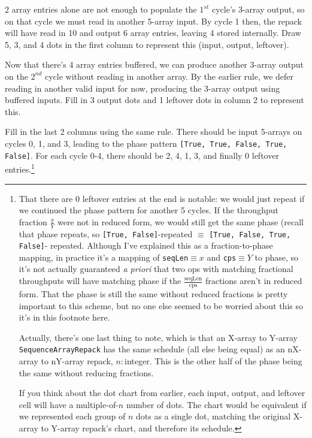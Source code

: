 \documentclass[12pt]{article}
\begin{document}
2 array entries alone are not enough to populate the $1^{st}$ cycle's
3-array output, so on that cycle we must read in another 5-array
input. By cycle 1 then, the repack will have read in 10 and output 6
array entries, leaving 4 stored internally. Draw 5, 3, and 4 dots in
the first column to represent this (input, output, leftover).

Now that there's 4 array entries buffered, we can produce another
3-array output on the $2^{nd}$ cycle without reading in another array.
By the earlier rule, we defer reading in another valid input for now,
producing the 3-array output using buffered inputs. Fill in 3 output
dots and 1 leftover dots in column 2 to represent this.

Fill in the last 2 columns using the same rule. There should be
input 5-arrays on cycles 0, 1, and 3, leading to the phase pattern
\texttt{[True, True, False, True, False]}. For each cycle 0-4, there
should be 2, 4, 1, 3, and finally 0 leftover entries.\footnote{
That there are 0 leftover entries at the end is notable: we would
just repeat if we continued the phase pattern for another 5 cycles.
If the throughput fraction $\frac{x}{Y}$ were not in reduced form, we
would still get the same phase (recall that phase repeats, so
\texttt{[True, False]}-repeated $\equiv$ \texttt{[True, False, True, False]}-%
repeated. Although I've explained this as a fraction-to-phase mapping,
in practice it's a mapping of \texttt{seqLen}$\equiv x$ and
\texttt{cps}$\equiv Y$ to phase, so it's not actually guaranteed
\textit{a priori} that two ops with matching fractional throughputs
will have matching phase if the $\frac{\text{seqLen}}{\text{cps}}$
fractions aren't in reduced form. That the phase is still the same
without reduced fractions is pretty important to this scheme, but
no one else seemed to be worried about this so it's in this footnote
here.

Actually, there's one last thing to note, which is that an
X-array to Y-array \texttt{SequenceArrayRepack} has the same schedule
(all else being equal) as an nX-array to nY-array repack, $n:$integer.
This is the other half of the phase being the same without reducing
fractions.

If you think about the dot chart from earlier, each input, output,
and leftover cell will have a multiple-of-$n$ number of dots. The
chart would be equivalent if we represented each group of $n$ dots
as a single dot, matching the original X-array to Y-array repack's chart,
and therefore its schedule.}
\end{document}

